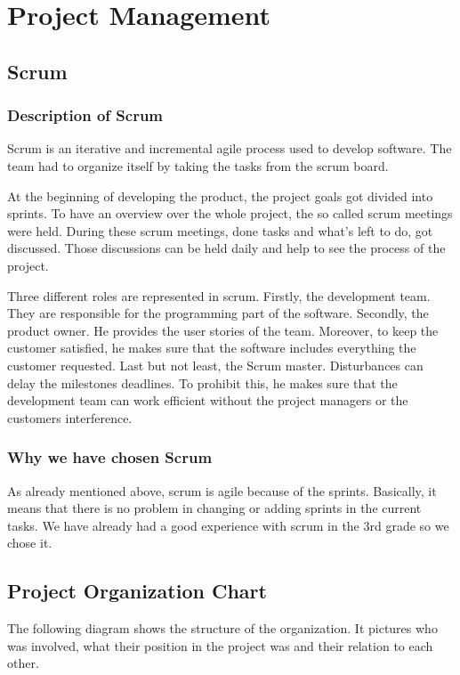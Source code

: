 \chapter{Project Management}
\section{Scrum}
\subsection{Description of Scrum}
Scrum is an iterative and incremental agile process used to develop software. The team had to organize itself by taking the tasks from the scrum board.

At the beginning of developing the product, the project goals got divided into sprints. To have an overview over the whole project, the so called scrum meetings were held. During these scrum meetings, done tasks and what's left to do, got discussed. Those discussions can be held daily and help to see the process of the project.

Three different roles are represented in scrum. Firstly, the development team. They are responsible for the programming part of the software. Secondly, the product owner. He provides the user stories of the team. Moreover, to keep the customer satisfied, he makes sure that the software includes everything the customer requested. Last but not least, the Scrum master. Disturbances can delay the milestones deadlines. To prohibit this, he makes sure that the development team can work efficient without the project managers or the customers interference.

\subsection{Why we have chosen Scrum}
As already mentioned above, scrum is agile because of the sprints. Basically, it means that there is no problem in changing or adding sprints in the current tasks. We have already had a good experience with scrum in the 3rd grade so we chose it.
\newpage
\section{Project Organization Chart}
The following diagram shows the structure of the organization. It pictures who was involved, what their position in the project was and their relation to each other. 

